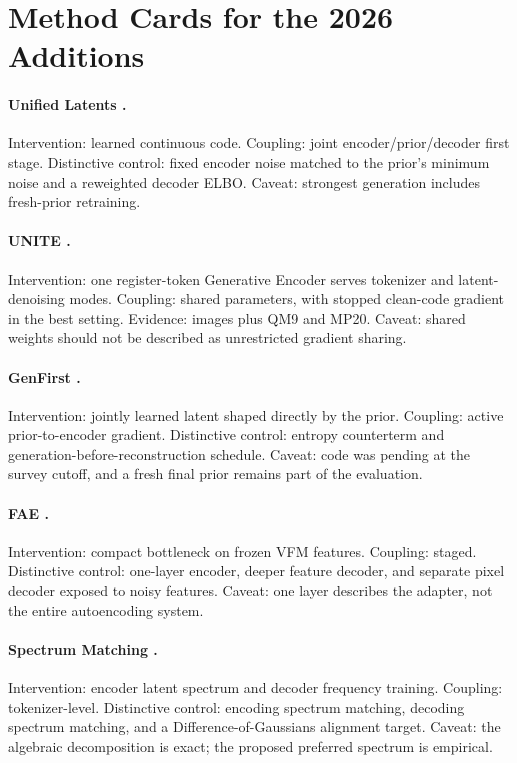 \documentclass{article}
\begin{document}
\section{Method Cards for the 2026 Additions}
\label{app:cards}

\paragraph{Unified Latents \citep{heek2026ul}.}
Intervention: learned continuous code. Coupling: joint encoder/prior/decoder first stage. Distinctive control: fixed encoder noise matched to the prior's minimum noise and a reweighted decoder ELBO. Caveat: strongest generation includes fresh-prior retraining.

\paragraph{UNITE \citep{duggal2026unite}.}
Intervention: one register-token Generative Encoder serves tokenizer and latent-denoising modes. Coupling: shared parameters, with stopped clean-code gradient in the best setting. Evidence: images plus QM9 and MP20. Caveat: shared weights should not be described as unrestricted gradient sharing.

\paragraph{GenFirst \citep{zheng2026genfirst}.}
Intervention: jointly learned latent shaped directly by the prior. Coupling: active prior-to-encoder gradient. Distinctive control: entropy counterterm and generation-before-reconstruction schedule. Caveat: code was pending at the survey cutoff, and a fresh final prior remains part of the evaluation.

\paragraph{FAE \citep{gao2026fae}.}
Intervention: compact bottleneck on frozen VFM features. Coupling: staged. Distinctive control: one-layer encoder, deeper feature decoder, and separate pixel decoder exposed to noisy features. Caveat: one layer describes the adapter, not the entire autoencoding system.

\paragraph{Spectrum Matching \citep{ning2026spectrum}.}
Intervention: encoder latent spectrum and decoder frequency training. Coupling: tokenizer-level. Distinctive control: encoding spectrum matching, decoding spectrum matching, and a Difference-of-Gaussians alignment target. Caveat: the algebraic decomposition is exact; the proposed preferred spectrum is empirical.
\end{document}
